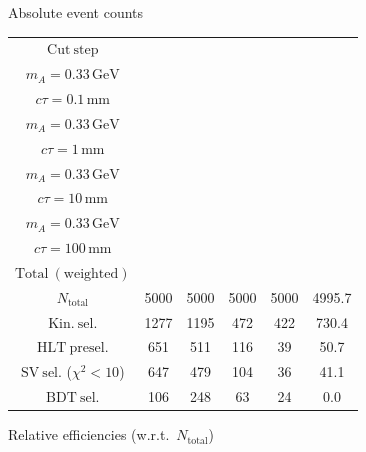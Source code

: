 \documentclass[10pt,a4paper]{article}
\renewcommand{\arraystretch}{1.4}
\begin{document}
{\footnotesize\setlength{\tabcolsep}{4pt}\renewcommand{\arraystretch}{1.05}%
\vspace{12pt}

Absolute event counts

\begin{tabular}{cccccc}
\toprule
$\mathrm{Cut\ step}$ & \shortstack{$m_{\pi}=1\,\mathrm{GeV}$\\$m_{A}=0.33\,\mathrm{GeV}$\\$c\tau=0.1\,\mathrm{mm}$} & \shortstack{$m_{\pi}=1\,\mathrm{GeV}$\\$m_{A}=0.33\,\mathrm{GeV}$\\$c\tau=1\,\mathrm{mm}$} & \shortstack{$m_{\pi}=1\,\mathrm{GeV}$\\$m_{A}=0.33\,\mathrm{GeV}$\\$c\tau=10\,\mathrm{mm}$} & \shortstack{$m_{\pi}=1\,\mathrm{GeV}$\\$m_{A}=0.33\,\mathrm{GeV}$\\$c\tau=100\,\mathrm{mm}$} & \shortstack{$\mathrm{QCD}$\\$\mathrm{Total\ (weighted)}$} \\
\midrule
$N_{\mathrm{total}}$ & 5000 & 5000 & 5000 & 5000 & 4995.7\\
$\mathrm{Kin.\ sel.}$ & 1277 & 1195 & 472 & 422 & 730.4\\
$\mathrm{HLT\ presel.}$ & 651 & 511 & 116 & 39 & 50.7\\
$\mathrm{SV\ sel.}$ ($\chi^2{<}10$) & 647 & 479 & 104 & 36 & 41.1\\
$\mathrm{BDT\ sel.}$ & 106 & 248 & 63 & 24 & 0.0\\
\bottomrule
\end{tabular}

\vspace{18pt}

Relative efficiencies (w.r.t.\ $N_{\mathrm{total}}$)

}
\end{document}
